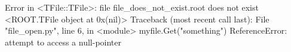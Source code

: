 \begin{footnotesize}
\begin{pyglist}[language=text,texcl=true,abovecaptionskip=0,style=bw]
Error in <TFile::TFile>: file file_does_not_exist.root does not exist
<ROOT.TFile object at 0x(nil)>
Traceback (most recent call last):
  File "file_open.py", line 6, in <module>
    myfile.Get("something")
ReferenceError: attempt to access a null-pointer
\end{pyglist}
\end{footnotesize}

